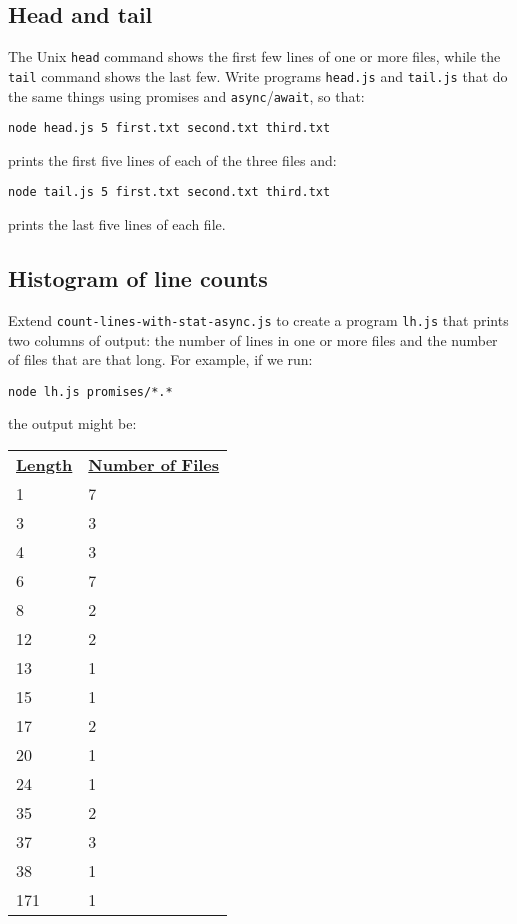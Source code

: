 \documentclass[krantzl]{krantz}
\begin{document}
\subsection*{Head and tail}


The Unix \texttt{head} command shows the first few lines of one or more files,
while the \texttt{tail} command shows the last few.
Write programs \texttt{head.js} and \texttt{tail.js} that do the same things using promises and \texttt{async}/\texttt{await},
so that:

\begin{lstlisting}[frame=tblr]
node head.js 5 first.txt second.txt third.txt
\end{lstlisting}


\noindent prints the first five lines of each of the three files and:

\begin{lstlisting}[frame=tblr]
node tail.js 5 first.txt second.txt third.txt
\end{lstlisting}


\noindent prints the last five lines of each file.

\subsection*{Histogram of line counts}


Extend \texttt{count-lines-with-stat-async.js} to create a program \texttt{lh.js}
that prints two columns of output:
the number of lines in one or more files
and the number of files that are that long.
For example,
if we run:

\begin{lstlisting}[frame=tblr]
node lh.js promises/*.*
\end{lstlisting}


\noindent the output might be:


\vspace{\baselineskip}
\begin{tabular}{ll}
\textbf{\underline{Length}} & \textbf{\underline{Number of Files}} \\
1 & 7 \\
3 & 3 \\
4 & 3 \\
6 & 7 \\
8 & 2 \\
12 & 2 \\
13 & 1 \\
15 & 1 \\
17 & 2 \\
20 & 1 \\
24 & 1 \\
35 & 2 \\
37 & 3 \\
38 & 1 \\
171 & 1 \\
\end{tabular}
\end{document}
